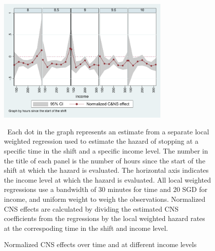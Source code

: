 \documentclass[reviewmode,AEJ]{AEA}
\begin{document}
\begin{appendices}
\begin{figure}
	{\centering
		\caption{Normalized CNS effects over time and at different income levels} %
		\includegraphics[width=0.75\textwidth]{./fg/cnsmfxulwr80to100spl1.pdf}
		\label{fg:2dulwrnoisy}
	}
	\begin{figurenotes}
	\small\ Each dot in the graph represents an estimate from a separate local weighted regression used to estimate the hazard of stopping at a specific time in the shift and a specific income level. The number in the title of each panel is the number of hours since the start of the shift at which the hazard is evaluated. The horizontal axis indicates the income level at which the hazard is evaluated. All local weighted regressions use a bandwidth of 30 minutes for time and 20 SGD for income, and uniform weight to weigh the observations. Normalized CNS effects are calculated by dividing the estimated CNS coefficients from the regressions by the local weighted hazard rates at the correspoding time in the shift and income level. 
	\end{figurenotes}
\end{figure}




\end{appendices}
\end{document}
